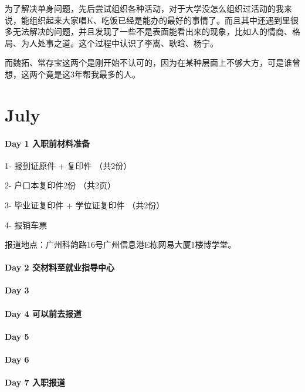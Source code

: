\documentclass[UTF8,a4paper,8pt]{ctexart}
\begin{document}
 	 		为了解决单身问题，先后尝试组织各种活动，对于大学没怎么组织过活动的我来说，能组织起来大家唱K、吃饭已经是能办的最好的事情了。而且其中还遇到里很多无法解决的问题，并且发现了一些不是表面能看出来的现象，比如人的情商、格局、为人处事之道。这个过程中认识了李嵩、耿晗、杨宁。
 	 		
 	 		而魏拓、常存宝这两个是刚开始不认可的，因为在某种层面上不够大方，可是谁曾想，这两个竟是这3年帮我最多的人。
 	 		
 	 		
 	 	
\section{July}
 	 \paragraph{Day 1   入职前材料准备    \quad     }
 	 	1- 报到证原件 + 复印件    （共2份）
 	 
 	 	2- 户口本复印件2份		（共2页）
 	 	
 	 	3- 毕业证复印件 + 学位证复印件 	（共2份）
 	 	
 	 	4- 报销车票 
 	 	
 	 	报道地点：广州科韵路16号广州信息港E栋网易大厦1楼博学堂。
 	 \paragraph{Day 2   交材料至就业指导中心    \quad     }
 	 
 	 \paragraph{Day 3       \quad     }
 	 
 	 \paragraph{Day 4    可以前去报道   \quad     }
 	 
 	 \paragraph{Day 5       \quad     }
 	 
 	 \paragraph{Day 6       \quad     }
 	 
 	 \paragraph{Day 7   入职报道    \quad     }
 	 
\end{document}
